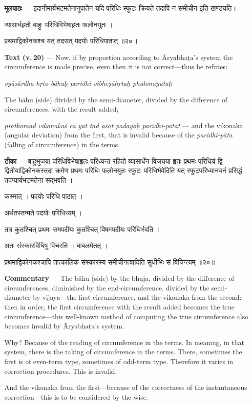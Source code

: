 \documentclass[11pt,a4paper]{article}
\newcommand{\skt}[1]{{\devanagarifont\color{sktcolor} #1}}
\newenvironment{bilingual}{%
  \par\noindent
  \begin{minipage}[t]{0.47\textwidth}%
}{%
  \par\end{minipage}%
}
\newcommand{\rightcol}{%
  \par\end{minipage}%
  \hfill
  \begin{minipage}[t]{0.47\textwidth}%
}
\begin{document}
\begin{bilingual}
\textbf{मूलपाठः} --- \skt{इदानीमार्यभटमतेनानुपातेन यदि परिधिः स्फुटः क्रियते तदापि न समीचीन इति खण्डयति}।

\skt{व्यासार्धहृतो बाहुः परिधिविभेषाहृतः फलोनयुतः} ।

\skt{प्रथमाद्विकोनकश्च यत् तदसत् पदयोः परिधिपातात्} ॥२०॥
\rightcol
\textbf{Text (v.\,20)} --- Now, if by proportion according to Āryabhaṭa's system the circumference is made precise, even then it is not correct---thus he refutes:

\textit{vyāsārdha-hṛto bāhuḥ paridhi-vibheṣāhṛtaḥ phalonayutaḥ}

The bāhu (side) divided by the semi-diameter, divided by the difference of circumferences, with the result added;

\textit{prathamād vikonakaś ca yat tad asat padayoḥ paridhi-pātāt} --- and the vikonaka (angular deviation) from the first, that is invalid because of the \textit{paridhi-pāta} (falling of circumference) in the terms.
\end{bilingual}

\medskip

\begin{bilingual}
\textbf{टीका} --- \skt{बाहुभुजया परिधिविभेषाहृतः परिध्यन्त रहितो व्यासार्धेन विजयया हृतः प्रथमः परिधियं द्वि द्वितीयाद्विकोनकस्तदा क्रमेण प्रथमः परिधिः फलोनयुतः स्फुटः परिधिर्भवेदिति यत् स्फुटपरिध्यानयनं प्रसिद्धं तदप्यार्यभटमतेना-सद्भवति} ।

\skt{कस्मात् । पदयोः परिधि पाठात्} ।

\skt{अर्थतस्तन्मते पदयोः परिधिध्यम्} ।

\skt{तत्र कुतश्चित् प्रथमः समपदीयः कुतश्चित् विषमपदीयः परिधिर्भवति} ।

\skt{अतः संस्कारविधिषु विचरति । बाबलमेतत्} ।

\skt{प्रथमाद्विकोनकश्चापि तात्कालिक संस्कारस्य समीचीनत्वादिति सुधीभिः स विचिन्त्यम्} ॥२०॥
\rightcol
\textbf{Commentary} --- The bāhu (side) by the bhuja, divided by the difference of circumferences, diminished by the end-circumference, divided by the semi-diameter by vijaya---the first circumference, and the vikonaka from the second: then in order, the first circumference with the result added becomes the true circumference---this well-known method of computing the true circumference also becomes invalid by Āryabhaṭa's system.

Why? Because of the reading of circumference in the terms. In meaning, in that system, there is the taking of circumference in the terms. There, sometimes the first is of even-term type, sometimes of odd-term type. Therefore it varies in correction procedures. This is invalid.

And the vikonaka from the first---because of the correctness of the instantaneous correction---this is to be considered by the wise.
\end{bilingual}
\end{document}

